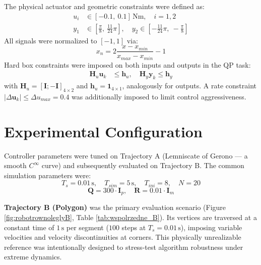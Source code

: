 The physical actuator and geometric constraints were defined as:
\begin{align}
    u_{i} &\in [-0.1,\ 0.1]\,\mathrm{Nm}, \quad i=1,2 \\
    y_{1} &\in \left[\tfrac{\pi}{8},\ \tfrac{11}{24}\pi\right], \quad
    y_{2} \in \left[-\tfrac{11}{24}\pi,\ -\tfrac{\pi}{8}\right]
\end{align}
All signals were normalized to $[-1, 1]$ via:
\begin{equation}
    \label{eq:normalization}
    x_{n} = 2\frac{x - x_{min}}{x_{max} - x_{min}} - 1
\end{equation}
Hard box constraints were imposed on both inputs and outputs in the QP task:
\begin{align}
    \boldsymbol{H}_u \boldsymbol{u}_k &\leq \boldsymbol{h}_u, \quad
    \boldsymbol{H}_y \boldsymbol{y}_k \leq \boldsymbol{h}_y
\end{align}
with $\boldsymbol{H}_u = [\boldsymbol{I}; -\boldsymbol{I}]_{4\times2}$ and $\boldsymbol{h}_u = \boldsymbol{1}_{4\times1}$, analogously for outputs. A rate constraint $|\Delta \boldsymbol{u}_k| \leq \Delta u_{max} = 0.4$ was additionally imposed to limit control aggressiveness.

\section{Experimental Configuration}
\label{sec:konfiguracja_eksperymentow}

Controller parameters were tuned on Trajectory A (Lemniscate of Gerono — a smooth $C^\infty$ curve) and subsequently evaluated on Trajectory B. The common simulation parameters were:
\begin{equation}
    T_s = 0.01\,\mathrm{s}, \quad T_{sim}=5\,\mathrm{s}, \quad T_{ini}=8, \quad N=20
\end{equation}
\begin{equation}
    \boldsymbol{Q} = 300 \cdot \boldsymbol{I}_{p}, \quad \boldsymbol{R} = 0.01 \cdot \boldsymbol{I}_{m}
\end{equation}

\textbf{Trajectory B (Polygon)} was the primary evaluation scenario (Figure \ref{fig:robotrownoleglyB}, Table \ref{tab:wspolrzedne_B}). Its vertices are traversed at a constant time of $1\,\mathrm{s}$ per segment ($100$ steps at $T_s=0.01\,\mathrm{s}$), imposing variable velocities and velocity discontinuities at corners. This physically unrealizable reference was intentionally designed to stress-test algorithm robustness under extreme dynamics.

